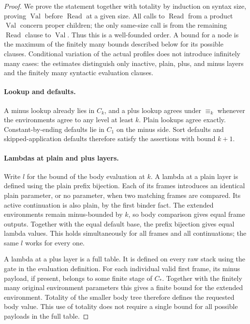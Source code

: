 \begin{proof}
We prove the statement together with totality by induction on syntax
size, proving $\operatorname{Val}$ before $\operatorname{Read}$ at a
given size.  All calls to $\operatorname{Read}$ from a product
$\operatorname{Val}$ concern proper children; the only same-size call
is from the remaining $\operatorname{Read}$ clause to
$\operatorname{Val}$.  Thus this is a well-founded order.  A bound for a
node is the maximum of the finitely many bounds described below for its
possible clauses.  Conditional variation of the actual profiles does
not introduce infinitely many cases: the estimates distinguish only
inactive, plain, plus, and minus layers and the finitely many syntactic
evaluation clauses.

\paragraph{Lookup and defaults.}
\label{obs:bound-leaves}
A minus lookup already lies in $C_k$, and a plus lookup agrees under
$\equiv_k$ whenever the environments agree to any level at least $k$.
Plain lookups agree exactly.  Constant-by-ending defaults lie in $C_1$
on the minus side.  Sort defaults and skipped-application defaults
therefore satisfy the assertions with bound $k+1$.

\paragraph{Lambdas at plain and plus layers.}
\label{obs:bound-positive-lambdas}
Write $l$ for the bound of the body evaluation at $k$.  A lambda at a
plain layer is defined using the plain prefix bijection.  Each of its
frames introduces an identical plain parameter, or no parameter, when
two matching frames are compared.  Its active continuation is also
plain, by the first binder fact.  The extended environments remain
minus-bounded by $k$, so body comparison gives equal frame outputs.
Together with the equal default base, the prefix bijection gives equal
lambda values.  This holds simultaneously for all frames and all
continuations; the same $l$ works for every one.

A lambda at a plus layer is a full table.  It is defined on every raw
stack using the gate in the evaluation definition.  For each individual
valid first frame, its minus payload, if present, belongs to some finite
stage of $C_*$.  Together with the finitely many original environment
parameters this gives a finite bound for the extended environment.
Totality of the smaller body tree therefore defines the requested body
value.  This use of totality does not require a single bound for all
possible payloads in the full table.


\end{proof}
